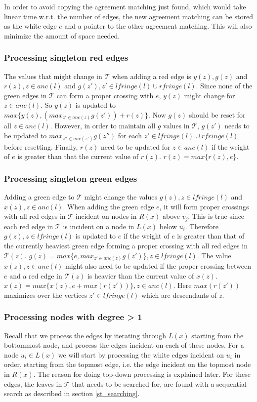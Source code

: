 In order to avoid copying the agreement matching just found, which would take linear time w.r.t. the number of edges, the new agreement matching can be stored as the white edge $e$ and a pointer to the other agreement matching. This will also minimize the amount of space needed.

\subsubsection{Processing singleton red edges}
The values that might change in $\mathcal{T}$ when adding a red edge is $y(z), g(z)$ and $r(z), z \in anc(l)$ and $g(z'), z' \in lfringe(l) \cup rfringe(l)$. Since none of the green edges in $\mathcal{T}$ can form a proper crossing with $e$, $y(z)$ might change for $z \in anc(l)$. So $y(z)$ is updated to $max\{y(z), (max_{z' \in anc(z)} g(z')) + r(z)\}$. Now $g(z)$ should be reset for all $z \in anc(l)$. However, in order to maintain all $g$ values in $\mathcal{T}$, $g(z')$ needs to be updated to $max_{z'' \in anc(z')} g(z'')$ for each $z' \in lfringe(l) \cup rfringe(l)$ before resetting. Finally, $r(z)$ need to be updated for $z \in anc(l)$ if the weight of $e$ is greater than that the current value of $r(z)$. $r(z)=max\{r(z), e\}$.

\subsubsection{Processing singleton green edges}
Adding a green edge to $\mathcal{T}$ might change the values $g(z), z \in lfringe(l)$ and $x(z), z \in anc(l)$. When adding the green edge $e$, it will form proper crossings with all red edges in $\mathcal{T}$ incident on nodes in $R(x)$ above $v_j$. This is true since each red edge in $\mathcal{T}$ is incident on a node in $L(x)$ below $u_i$. Therefore $g(z), z \in lfringe(l)$ is updated to $e$ if the weight of $e$ is greater than that of the currently heaviest green edge forming a proper crossing with all red edges in $\mathcal{T}(z)$. $g(z)=max\{e, max_{z' \in anc(z)} g(z')\}, z \in lfringe(l)$. The value $x(z), z \in anc(l)$ might also need to be updated if the proper crossing between $e$ and a red edge in $\mathcal{T}(z)$ is heavier than the current value of $x(z)$. $x(z)=max\{x(z), e + max(r(z'))\}, z \in anc(l)$. Here $max(r(z'))$ maximizes over the vertices $z' \in lfringe(l)$ which are descendants of $z$.

\subsubsection{Processing nodes with degree > 1}
Recall that we process the edges by iterating through $L(x)$ starting from the bottommost node, and process the edges incident on each of these nodes. For a node $u_i \in L(x)$ we will start by processing the white edges incident on $u_i$ in order, starting from the topmost edge, i.e. the edge incident on the topmost node in $R(x)$. The reason for doing top-down processing is explained later. For these edges, the leaves in $\mathcal{T}$ that needs to be searched for, are found with a sequential search as described in section \ref{st_searching}.

